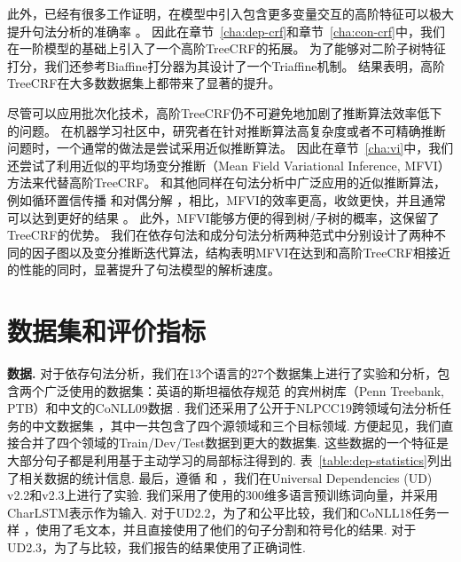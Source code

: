 此外，已经有很多工作证明，在模型中引入包含更多变量交互的高阶特征可以极大提升句法分析的准确率 \citep{mcdonald-pereira-2006-online,chen-manning-2014-fast,ji-etal-2019-graph}。
因此在章节~\ref{cha:dep-crf}和章节~\ref{cha:con-crf}中，我们在一阶模型的基础上引入了一个高阶TreeCRF的拓展。
为了能够对二阶子树特征打分，我们还参考Biaffine打分器为其设计了一个Triaffine机制。
结果表明，高阶TreeCRF在大多数数据集上都带来了显著的提升。

尽管可以应用批次化技术，高阶TreeCRF仍不可避免地加剧了推断算法效率低下的问题。
在机器学习社区中，研究者在针对推断算法高复杂度或者不可精确推断问题时，一个通常的做法是尝试采用近似推断算法。
因此在章节~\ref{cha:vi}中，我们还尝试了利用近似的平均场变分推断（Mean Field Variational Inference, MFVI）方法来代替高阶TreeCRF。
和其他同样在句法分析中广泛应用的近似推断算法，例如循环置信传播 \citep{smith-eisner-2008-dependency}和对偶分解 \citep{martins-etal-2009-concise}，相比，MFVI的效率更高，收敛更快，并且通常可以达到更好的结果 \citep{wang-etal-2019-second}。
此外，MFVI能够方便的得到树/子树的概率，这保留了TreeCRF的优势。
我们在依存句法和成分句法分析两种范式中分别设计了两种不同的因子图以及变分推断迭代算法，结构表明MFVI在达到和高阶TreeCRF相接近的性能的同时，显著提升了句法模型的解析速度。

\section{数据集和评价指标}



\noindent\textbf{数据.}
对于依存句法分析，我们在13个语言的27个数据集上进行了实验和分析，包含两个广泛使用的数据集：英语的斯坦福依存规范 \citep{chen-manning-2014-fast}的宾州树库（Penn Treebank, PTB）和中文的CoNLL09数据 \citep{hajic-etal-2009-conll}.
我们还采用了公开于NLPCC19跨领域句法分析任务的中文数据集 \citep{peng-etal-2019-overview}，其中一共包含了四个源领域和三个目标领域.
方便起见，我们直接合并了四个领域的Train/Dev/Test数据到更大的数据集.
这些数据的一个特征是大部分句子都是利用基于主动学习的局部标注得到的.
表~\ref{table:dep-statistics}列出了相关数据的统计信息.
最后，遵循 \citet{ji-etal-2019-graph}和 \citet{zhang-etal-2019-empirical}，我们在Universal Dependencies (UD) v2.2和v2.3上进行了实验.
我们采用了\citet{zeman-etal-2018-conll}使用的300维多语言预训练词向量，并采用CharLSTM表示作为输入.
对于UD2.2，为了和\citet{ji-etal-2019-graph}公平比较，我们和CoNLL18任务一样 \citep{zeman-etal-2018-conll}，使用了毛文本，并且直接使用了他们的句子分割和符号化的结果.
对于UD2.3，为了与\citet{zhang-etal-2019-empirical}比较，我们报告的结果使用了正确词性.


